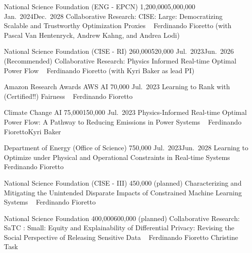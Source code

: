 
\vspace{-16pt}

\begin{projects}

	\grantentryPI
	{National Science Foundation (ENG - EPCN)}
	{1,200,000}{5,000,000}
	{Jan.~2024}{Dec.~2028}
	{Collaborative Research: CISE: Large: Democratizing Scalable and Trustworthy Optimization Proxies}
	{~}
	{Ferdinando Fioretto (with Pascal Van Hentenryck, Andrew Kahng, and Andrea Lodi)}

	\grantentryPI
	{National Science Foundation (CISE - RI)}
	{260,000}{520,000}
	{Jul.~2023}{Jun.~2026 (Recommended)}
	{Collaborative Research: Physics Informed Real-time Optimal Power Flow}
	{~}
	{Ferdinando Fioretto (with Kyri Baker as lead PI)}

	\grantentrySinglePI
	{Amazon Research Awards AWS AI}
	{70,000}
	{Jul.~2023}{}
	{Learning to Rank with (Certified!!) Fairness}
	{~}
	{Ferdinando Fioretto}


	\grantentrycoPI
	{Climate Change AI}
	{75,000}{150,000}
	{Jul.~2023}{}
	{Physics-Informed Real-time Optimal Power Flow: A Pathway to Reducing Emissions in Power Systems}
	{~}
	{Ferdinando Fioretto}{Kyri Baker}

\end{projects}

\begin{projects}

	\grantentrySinglePI
	{Department of Energy (Office of Science)}
	{750,000}
	{Jul.~2023}{Jun.~2028}
	{Learning to Optimize under Physical and Operational Constraints in Real-time Systems}
	{~}
	{Ferdinando Fioretto}

	\grantentrySinglePI
	{National Science Foundation (CISE - III)}
	{450,000}
	{(planned)}{}
	{Characterizing and Mitigating the Unintended Disparate Impacts of Constrained Machine Learning Systems}
	{~}
	{Ferdinando Fioretto}

	\grantentrycoPI
	{National Science Foundation}
	{400,000}{600,000}
	{(planned)}{}
	{Collaborative Research: SaTC : Small: Equity and Explainability of 
	Differential Privacy: Revising the Social Perspective of Releasing Sensitive Data}
	{~}
	{Ferdinando Fioretto}
	{Christine Task}

\end{projects}